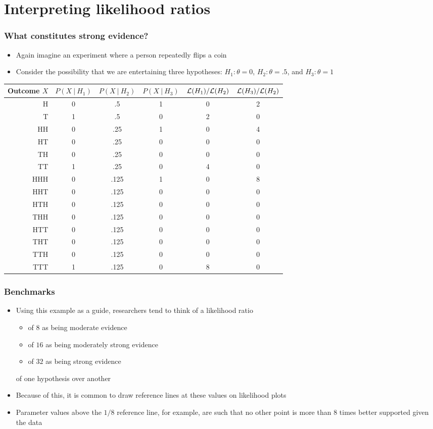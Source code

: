 \documentclass[aspectratio=169]{beamer}
\begin{document}
\section{Interpreting likelihood ratios}
\begin{frame}\frametitle{What constitutes strong evidence?}
\begin{itemize}
\item Again imagine an experiment where a person repeatedly flips a
  coin
\item Consider the possibility that we are entertaining three
  hypotheses: $H_1:\theta = 0$, $H_2:\theta=.5$, and $H_3:\theta = 1$
\end{itemize}
\end{frame}

\begin{frame}
\tiny
  \begin{tabular}{rccccc}
    Outcome $X$ & $P(X ~|~ H_1)$ & $P(X ~|~ H_2)$ & $P(X ~|~ H_3)$ & ${\cal L}(H_1) / {\cal L}(H_2)$ & ${\cal L}(H_3) / {\cal L}(H_2)$ \\ \hline
H   & 0 & .5   & 1 & 0 & 2 \\
T   & 1 & .5   & 0 & 2 & 0 \\ \hline
HH  & 0 & .25  & 1 & 0 & 4 \\
HT  & 0 & .25  & 0 & 0 & 0 \\
TH  & 0 & .25  & 0 & 0 & 0 \\
TT  & 1 & .25  & 0 & 4 & 0 \\ \hline
HHH & 0 & .125 & 1 & 0 & 8 \\
HHT & 0 & .125 & 0 & 0 & 0 \\
HTH & 0 & .125 & 0 & 0 & 0 \\
THH & 0 & .125 & 0 & 0 & 0 \\
HTT & 0 & .125 & 0 & 0 & 0 \\
THT & 0 & .125 & 0 & 0 & 0 \\
TTH & 0 & .125 & 0 & 0 & 0 \\
TTT & 1 & .125 & 0 & 8 & 0 \\ \hline
  \end{tabular}
\normalsize
\end{frame}

\begin{frame}\frametitle{Benchmarks}
  \begin{itemize}
  \item Using this example as a guide, researchers tend to think of a likelihood ratio
    \begin{itemize}
    \item of $8$ as being moderate evidence 
    \item of $16$ as being moderately strong evidence 
    \item of $32$ as being strong evidence 
    \end{itemize}
    of one hypothesis over another
  \item Because of this, it is common to draw reference lines at these values on likelihood plots
  \item Parameter values above the $1/8$ reference line, for example, are such that no other point
    is more than 8 times better supported given the data
  \end{itemize}
\end{frame}
\end{document}
